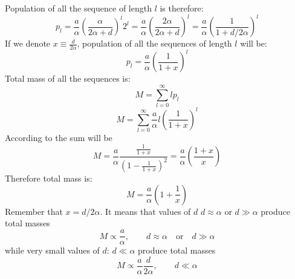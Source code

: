 \documentclass[12pt]{paper}
\newcommand{\ga}{\alpha}
\newcommand{\pt}[1]{\left( #1\right)}
\begin{document}
Population of all the sequence of length $l$ is therefore:
  \begin{equation}
    p_l=\frac{a}{\ga}\pt{\frac{\ga}{2\ga+d}}^l2^l=\frac{a}{\ga}\pt{\frac{2\ga}{2\ga+d}}^l=
    \frac{a}{\ga}\pt{\frac{1}{1+d/2\ga}}^l
  \end{equation} 
If we denote $x\equiv\frac{d}{2\ga}$, population of all the sequences of length $l$ will be:
\begin{equation}
\boxed{ p_l=\frac{a}{\ga}\pt{\frac{1}{1+x}}^l}
\end{equation} 
Total mass of all the sequences is:
\begin{equation}
 M=\sum_{l=0}^{\infty}lp_l
\end{equation} 
\begin{equation}
 M=\sum_{l=0}^{\infty}\frac{a}{\ga}l\pt{\frac{1}{1+x}}^l
\end{equation} 
According to \cite{Gradstein1980} the sum will be
\begin{equation}
 M=\frac{a}{\ga}\frac{\frac{1}{1+x}}{\pt{1-\frac{1}{1+x}}^2}=\frac{a}{\ga}\pt{\frac{1+x}{x}}
\end{equation}
Therefore total mass is:
  \begin{equation}
   M=\frac{a}{\ga}\pt{1+\frac{1}{x}}
  \end{equation} 
Remember that $x=d/2\ga$. It means that values of $d$ $d\approx \ga$ or $d\gg \ga$ produce total 
masses 
\begin{equation}
 M\propto\frac{a}{\ga}, \qquad d\approx \ga\quad \mbox{or}\quad d\gg \ga
\end{equation} 
while very small values of $d:\,d\ll\ga$ produce total masses 
\begin{equation}
M\propto \frac{a}{\ga}\frac{d}{2\ga} ,\qquad d\ll\ga
\end{equation}



 
  
\end{document}
